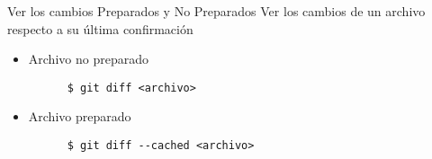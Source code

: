 \begin{frame}[fragile]{Ver los cambios Preparados y No Preparados}
  Ver los cambios de un archivo respecto a su última confirmación
  \begin{itemize}
    \item \alert{Archivo no preparado}
    \begin{verbatim}
      $ git diff <archivo>
    \end{verbatim}
    \item \alert{Archivo preparado}
    \begin{verbatim}
      $ git diff --cached <archivo>
    \end{verbatim}
  \end{itemize}
\end{frame}
